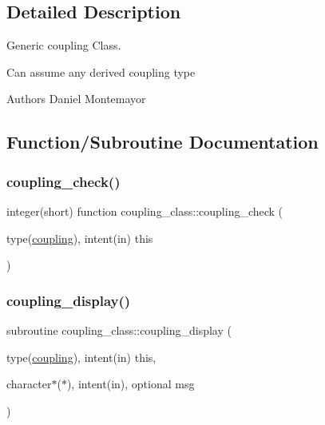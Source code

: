 \subsection{Detailed Description}
Generic coupling Class. 

Can assume any derived coupling type \begin{DoxyAuthor}{Authors}
Daniel Montemayor 
\end{DoxyAuthor}


\subsection{Function/\+Subroutine Documentation}
\mbox{\label{namespacecoupling__class_a41b687a0ad543c445aa29923c229e39d}} 
\subsubsection{\texorpdfstring{coupling\+\_\+check()}{coupling\_check()}}
{\footnotesize\ttfamily integer(short) function coupling\+\_\+class\+::coupling\+\_\+check (\begin{DoxyParamCaption}\item[{type(\hyperlink{structcoupling__class_1_1coupling}{coupling}), intent(in)}]{this }\end{DoxyParamCaption})\hspace{0.3cm}{\ttfamily [private]}}

\mbox{\label{namespacecoupling__class_a543d9a76307b2c60048d8f390fb40859}} 
\subsubsection{\texorpdfstring{coupling\+\_\+display()}{coupling\_display()}}
{\footnotesize\ttfamily subroutine coupling\+\_\+class\+::coupling\+\_\+display (\begin{DoxyParamCaption}\item[{type(\hyperlink{structcoupling__class_1_1coupling}{coupling}), intent(in)}]{this,  }\item[{character$\ast$($\ast$), intent(in), optional}]{msg }\end{DoxyParamCaption})\hspace{0.3cm}{\ttfamily [private]}}

